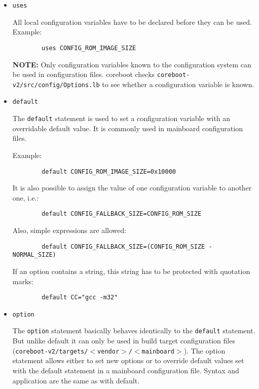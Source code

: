 \documentclass[titlepage,12pt]{article}
\begin{document}
\begin{itemize}

\item \begin{verbatim}uses\end{verbatim}

All local configuration variables have to be declared before they can be
used. Example:
\begin{verbatim}
        uses CONFIG_ROM_IMAGE_SIZE
\end{verbatim}

\textbf{NOTE:} Only configuration variables known to the configuration
system can be used in configuration files. coreboot checks
\texttt{coreboot-v2/src/config/Options.lb} to see whether a configuration
variable is known.

\item \begin{verbatim}default\end{verbatim}

The \texttt{default} statement is used to set a configuration variable
with an overridable default value. It is commonly used in mainboard
configuration files.

Example:

\begin{verbatim}
        default CONFIG_ROM_IMAGE_SIZE=0x10000
\end{verbatim}

It is also possible to assign the value of one configuration variable to
another one, i.e.:

\begin{verbatim}
        default CONFIG_FALLBACK_SIZE=CONFIG_ROM_SIZE
\end{verbatim}

Also, simple expressions are allowed:

\begin{verbatim}
        default CONFIG_FALLBACK_SIZE=(CONFIG_ROM_SIZE -  NORMAL_SIZE)
\end{verbatim}

If an option contains a string, this string has to be protected with
quotation marks:

\begin{verbatim}
        default CC="gcc -m32"
\end{verbatim}

\item \begin{verbatim}option\end{verbatim}

The \texttt{option} statement basically behaves identically to the
\texttt{default} statement. But unlike default it can only be used in
build target configuration files
(\texttt{coreboot-v2/targets/$<$vendor$>$/$<$mainboard$>$}). The option
statement allows either to set new options or to override default values
set with the default statement in a mainboard configuration file.
Syntax and application are the same as with default.

\end{itemize}
\end{document}

